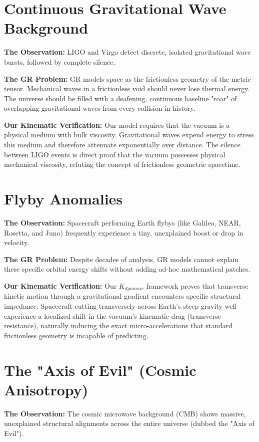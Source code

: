 \documentclass[reprint,amsmath,amssymb,aps,prd,twocolumn]{revtex4-2}
\begin{document}
\section{Continuous Gravitational Wave Background}
\textbf{The Observation:} LIGO and Virgo detect discrete, isolated gravitational wave bursts, followed by complete silence.

\textbf{The GR Problem:} GR models space as the frictionless geometry of the metric tensor. Mechanical waves in a frictionless void should never lose thermal energy. The universe should be filled with a deafening, continuous baseline "roar" of overlapping gravitational waves from every collision in history.

\textbf{Our Kinematic Verification:} Our model requires that the vacuum is a physical medium with bulk viscosity. Gravitational waves expend energy to stress this medium and therefore attenuate exponentially over distance. The silence between LIGO events is direct proof that the vacuum possesses physical mechanical viscosity, refuting the concept of frictionless geometric spacetime.

\section{Flyby Anomalies}
\textbf{The Observation:} Spacecraft performing Earth flybys (like Galileo, NEAR, Rosetta, and Juno) frequently experience a tiny, unexplained boost or drop in velocity.

\textbf{The GR Problem:} Despite decades of analysis, GR models cannot explain these specific orbital energy shifts without adding ad-hoc mathematical patches.

\textbf{Our Kinematic Verification:} Our $K_{dynamic}$ framework proves that transverse kinetic motion through a gravitational gradient encounters specific structural impedance. Spacecraft cutting transversely across Earth's steep gravity well experience a localized shift in the vacuum's kinematic drag (transverse resistance), naturally inducing the exact micro-accelerations that standard frictionless geometry is incapable of predicting.

\section{The "Axis of Evil" (Cosmic Anisotropy)}
\textbf{The Observation:} The cosmic microwave background (CMB) shows massive, unexplained structural alignments across the entire universe (dubbed the "Axis of Evil").
\end{document}
